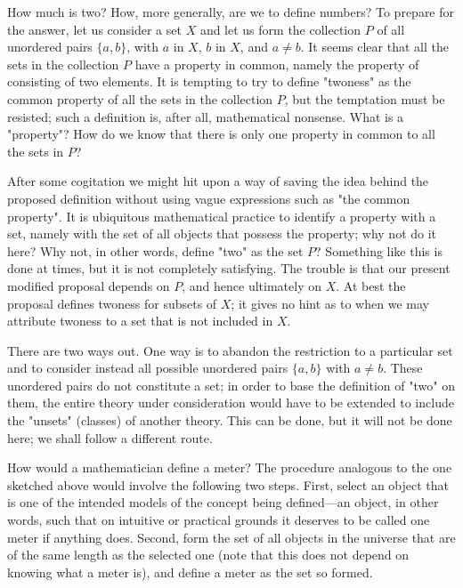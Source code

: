 How much is two? How, more generally, are we to define numbers? To prepare for the answer, let us consider a set $X$ and let us form the collection $P$ of all unordered pairs $\{ a, b \}$, with $a$ in $X$, $b$ in $X$, and $a \neq b$. It seems clear that all the sets in the collection $P$ have a property in common, namely the property of consisting of two elements. It is tempting to try to define "twoness" as the common property of all the sets in the collection $P$, but the temptation must be resisted; such a definition is, after all, mathematical nonsense. What is a "property"? How do we know that there is only one property in common to all the sets in $P$? 

After some cogitation we might hit upon a way of saving the idea behind the proposed definition without using vague expressions such as "the common property". It is ubiquitous  mathematical  practice to identify a property with a set, namely with the set of all objects that possess the property; why not do it here? Why not, in other words, define "two" as the set $P$? Something like this is done at times, but it is not completely satisfying. The trouble is that our present modified proposal depends on $P$, and hence ultimately on $X$. At best the proposal defines twoness for subsets of $X$; it gives no hint as to when we may attribute twoness to a set that is not included in $X$. 

There are two ways out. One way is to abandon the restriction to a particular set and to consider instead all possible unordered pairs $\{ a, b \}$ with $a \neq b$. These unordered pairs do not constitute a set; in order to base the definition of "two" on them, the entire theory under consideration would have to be extended to include the "unsets" (classes) of another theory. This can be done, but it will not be done here; we shall follow a different route. 

How would a mathematician define a meter? The procedure analogous to the one sketched above would involve the following two steps. First, select an object that is one of the intended models of the concept being defined—an object, in other words, such that on intuitive or practical grounds it deserves to be called one meter if anything does. Second, form the set of all objects in the universe that are of the same length as the selected one (note that this does not depend on knowing what a meter is), and define a meter as the set so formed. 

